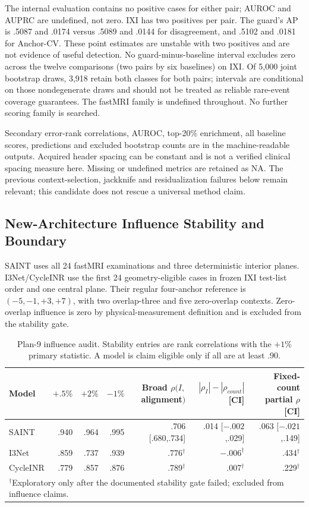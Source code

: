 

The internal evaluation contains no positive cases for either pair; AUROC and AUPRC are undefined, not zero. IXI has two positives per pair. The guard's AP is .5087 and .0174 versus .5089 and .0144 for disagreement, and .5102 and .0181 for Anchor-CV. These point estimates are unstable with two positives and are not evidence of useful detection. No guard-minus-baseline interval excludes zero across the twelve comparisons (two pairs by six baselines) on IXI. Of 5,000 joint bootstrap draws, 3,918 retain both classes for both pairs; intervals are conditional on those nondegenerate draws and should not be treated as reliable rare-event coverage guarantees. The fastMRI family is undefined throughout. No further scoring family is searched.

Secondary error-rank correlations, AUROC, top-20\% enrichment, all baseline scores, predictions and excluded bootstrap counts are in the machine-readable outputs. Acquired header spacing can be constant and is not a verified clinical spacing measure here. Missing or undefined metrics are retained as NA. The previous context-selection, jackknife and residualization failures below remain relevant; this candidate does not rescue a universal method claim.

\subsection{New-Architecture Influence Stability and Boundary}
SAINT uses all 24 fastMRI examinations and three deterministic interior planes. I3Net/CycleINR use the first 24 geometry-eligible cases in frozen IXI test-list order and one central plane. Their regular four-anchor reference is $(-5,-1,+3,+7)$, with two overlap-three and five zero-overlap contexts. Zero-overlap influence is zero by physical-measurement definition and is excluded from the stability gate.

\begin{table}[t]
\centering
\caption{Plan-9 influence audit. Stability entries are rank correlations with the $+1\%$ primary statistic. A model is claim eligible only if all are at least .90.}
\label{tab:p9-influence}
\setlength{\tabcolsep}{4pt}
\begin{tabular}{lrrrrrr}
\toprule
Model & $+.5\%$ & $+2\%$ & $-1\%$ & Broad $\rho(I,$alignment$)$ & $|\rho_I|-|\rho_{count}|$ [CI] & Fixed-count partial $\rho$ [CI]\\
\midrule
SAINT & .940 & .964 & .995 & .706 [.680,.734] & .014 [$-.002$,.029] & .063 [$-.021$,.149]\\
I3Net & .859 & .737 & .939 & .776$^{\dagger}$ & $-.006^{\dagger}$ & .434$^{\dagger}$\\
CycleINR & .779 & .857 & .876 & .789$^{\dagger}$ & .007$^{\dagger}$ & .229$^{\dagger}$\\
\bottomrule
\multicolumn{7}{l}{$^{\dagger}$Exploratory only after the documented stability gate failed; excluded from influence claims.}
\end{tabular}
\end{table}

